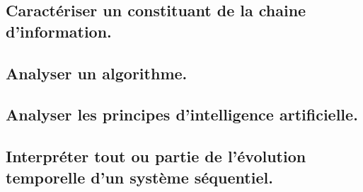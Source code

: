\documentclass[10pt,fleqn]{book}
\newcommand{\repRel}{../..}
\newcommand{\repStyle}{\repRel/Style}
\newcommand{\td}{fichier_td}
\newcommand{\repExos}{\repRel/ExercicesCompetences}
\newcommand{\repExo}{dossier}
\begin{document}
\begin{multicols}{2} 

\end{multicols}

\subsection{Caractériser un constituant de la chaine d’information.} 

\begin{multicols}{2} 

\renewcommand{\repExo}{\repExos/A3_AnalyseFonctionnelleStructurelle/A3_06_ChaineInfo/507_Divers}
\renewcommand{\td}{507_Divers}
\graphicspath{{\repStyle/png/}{\repExo/images/}}


\renewcommand{\repExo}{\repExos/A3_AnalyseFonctionnelleStructurelle/A3_06_ChaineInfo/50_BancBalafre}
\renewcommand{\td}{50_BancBalafre}
\graphicspath{{\repStyle/png/}{\repExo/images/}}


\renewcommand{\repExo}{\repExos/A3_AnalyseFonctionnelleStructurelle/A3_06_ChaineInfo/538_Codeur}
\renewcommand{\td}{538_Codeur}
\graphicspath{{\repStyle/png/}{\repExo/images/}}


\end{multicols}

\subsection{Analyser un algorithme. } 

\begin{multicols}{2} 

\end{multicols}

\subsection{Analyser les principes d'intelligence artificielle. } 

\begin{multicols}{2} 

\end{multicols}

\subsection{Interpréter tout ou partie de l’évolution temporelle d’un système séquentiel.} 
\end{document}
